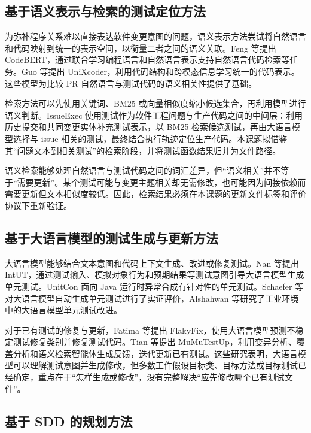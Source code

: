 \subsection{基于语义表示与检索的测试定位方法}

为弥补程序关系难以直接表达软件变更意图的问题，语义表示方法尝试将自然语言和代码映射到统一的表示空间，以衡量二者之间的语义关联。Feng 等\cite{feng2020codebert}提出 CodeBERT，通过联合学习编程语言和自然语言表示支持自然语言代码检索等任务。Guo 等\cite{guo2022unixcoder}提出 UniXcoder，利用代码结构和跨模态信息学习统一的代码表示。这些模型为比较 PR 自然语言与测试代码的语义相关性提供了基础。

检索方法可以先使用关键词、BM25 或向量相似度缩小候选集合，再利用模型进行语义判断。IssueExec\cite{liu2026issueexec} 使用测试作为软件工程问题与生产代码之间的中间层：利用历史提交和共同变更实体补充测试表示，以 BM25 检索候选测试，再由大语言模型选择与 issue 相关的测试，最终结合执行轨迹定位生产代码。本课题拟借鉴其“问题文本到相关测试”的检索阶段，并将测试函数结果归并为文件路径。

语义检索能够处理自然语言与测试代码之间的词汇差异，但“语义相关”并不等于“需要更新”。某个测试可能与变更主题相关却无需修改，也可能因为间接依赖而需要更新但文本相似度较低。因此，检索结果必须在本课题的更新文件标签和评价协议下重新验证。

\subsection{基于大语言模型的测试生成与更新方法}

大语言模型能够结合文本意图和代码上下文生成、改进或修复测试。Nan 等\cite{nan2025intut}提出 IntUT，通过测试输入、模拟对象行为和预期结果等测试意图引导大语言模型生成单元测试。UnitCon\cite{jang2025unitcon} 面向 Java 运行时异常合成有针对性的单元测试。Schaefer 等\cite{schaefer2024empirical}对大语言模型自动生成单元测试进行了实证评价，Alshahwan 等\cite{alshahwan2024testgenllm}研究了工业环境中的大语言模型单元测试改进。

对于已有测试的修复与更新，Fatima 等\cite{fatima2024flakyfix}提出 FlakyFix，使用大语言模型预测不稳定测试修复类别并修复测试代码。Tian 等\cite{tian2026mumutestup}提出 MuMuTestUp，利用变异分析、覆盖分析和语义检索智能体生成反馈，迭代更新已有测试。这些研究表明，大语言模型可以理解测试意图并生成修改，但多数工作假设目标类、目标方法或目标测试已经确定，重点在于“怎样生成或修改”，没有完整解决“应先修改哪个已有测试文件”。

\subsection{基于 SDD 的规划方法}

